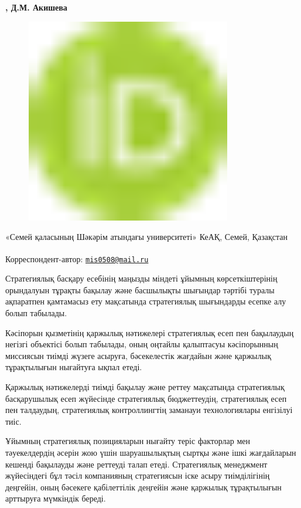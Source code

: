 {\bfseries ,
Д.М.
Акишева}
\begin{figure}[H]
	\centering
	\includegraphics[width=0.8\textwidth]{media/ekon2/image1}
	\caption*{}
\end{figure}


«Семей қаласының Шәкәрім атындағы университеті» КеАҚ, Семей, Қазақстан

{\bfseries \textsuperscript{\envelope }}Корреспондент-автор:
\href{mailto:mis0508@mail.ru}{\nolinkurl{mis0508@mail.ru}}

Стратегиялық басқару есебінің маңызды міндеті ұйымның көрсеткіштерінің
орындалуын тұрақты бақылау және басшылықты шығындар тәртібі туралы
ақпаратпен қамтамасыз ету мақсатында стратегиялық шығындарды есепке алу
болып табылады.

Кәсіпорын қызметінің қаржылық нәтижелері стратегиялық есеп пен
бақылаудың негізгі объектісі болып табылады, оның оңтайлы қалыптасуы
кәсіпорынның миссиясын тиімді жүзеге асыруға, бәсекелестік жағдайын және
қаржылық тұрақтылығын нығайтуға ықпал етеді.

Қаржылық нәтижелерді тиімді бақылау және реттеу мақсатында стратегиялық
басқарушылық есеп жүйесінде стратегиялық бюджеттеудің, стратегиялық есеп
пен талдаудың, стратегиялық контроллингтің заманауи технологиялары
енгізілуі тиіс.

Ұйымның стратегиялық позицияларын нығайту теріс факторлар мен
тәуекелдердің әсерін жою үшін шаруашылықтың сыртқы және ішкі жағдайларын
кешенді бақылауды және реттеуді талап етеді. Стратегиялық менеджмент
жүйесіндегі бұл тәсіл компанияның стратегиясын іске асыру тиімділігінің
деңгейін, оның бәсекеге қабілеттілік деңгейін және қаржылық тұрақтылығын
арттыруға мүмкіндік береді.

